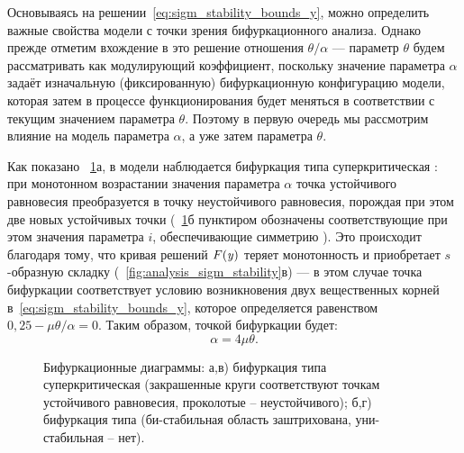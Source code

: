 Основываясь на решении~\eqref{eq:sigm_stability_bounds_y}, можно определить важные свойства модели с точки зрения бифуркационного анализа. Однако прежде отметим вхождение в это решение отношения $\theta/\alpha$ --- параметр $\theta$ будем рассматривать как модулирующий коэффициент, поскольку значение параметра $\alpha$ задаёт изначальную (фиксированную) бифуркационную конфигурацию модели, которая затем в процессе функционирования будет меняться в соответствии с текущим значением параметра $\theta$. Поэтому в первую очередь мы рассмотрим влияние на модель параметра $\alpha$, а уже затем параметра $\theta$.

Как показано \onfigure~\ref{fig:analysis_sigm_bifurcations}а, в модели наблюдается бифуркация типа суперкритическая : при монотонном возрастании значения параметра $\alpha$ точка устойчивого равновесия преобразуется в точку неустойчивого равновесия, порождая при этом две новых устойчивых точки (\onfigure~\ref{fig:analysis_sigm_bifurcations}б пунктиром обозначены соответствующие при этом значения параметра $i$, обеспечивающие симметрию ). Это происходит благодаря тому, что кривая решений $F(\mathit{y})$ теряет монотонность и приобретает $s$-образную складку (\seefigure~\ref{fig:analysis_sigm_stability}в) --- в этом случае точка бифуркации соответствует условию возникновения двух вещественных корней в~\eqref{eq:sigm_stability_bounds_y}, которое определяется равенством $0,25 - \mu \theta / \alpha = 0$. Таким образом, точкой бифуркации будет:
\begin{equation}
    \label{eq:sigm_bifurcation_alpha}
    \alpha =  4 \mu \theta.
\end{equation}

\begin{figure}[ht]
    \caption{Бифуркационные диаграммы: а,в) бифуркация типа суперкритическая  (закрашенные круги соответствуют точкам устойчивого равновесия, проколотые -- неустойчивого); б,г) бифуркация типа  (би-стабильная область заштрихована, уни-стабильная -- нет).}
    \label{fig:analysis_sigm_bifurcations}
\end{figure}

